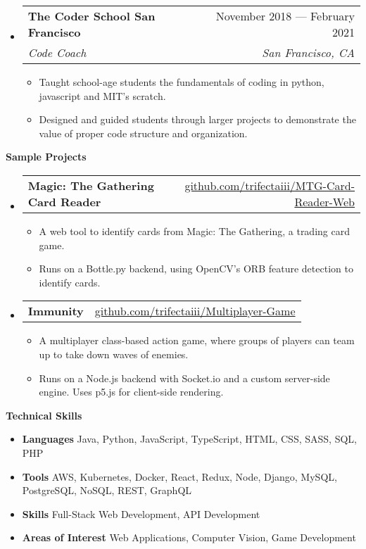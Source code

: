 \documentclass[letterpaper,12pt]{article}[leftmargin=*]
\makeatletter
\def \entryspacing {-0pt}
\renewcommand{\section}[2]{\vspace{5pt}
  \colorbox{secondary}{\color{white}\raggedbottom\normalsize\textbf{{#1}{\hspace{7pt}#2}}}
}
\newcommand{\resumeEntryStart}{\begin{itemize}[leftmargin=2.5mm]}
\newcommand{\resumeEntryEnd}{\end{itemize}\vspace{\entryspacing}}
\newcommand{\resumeItemListStart}{\begin{itemize}[leftmargin=4.5mm]}
\newcommand{\resumeItemListEnd}{\end{itemize}}
\newcommand{\resumeItem}[1]{
  \item{%
    {#1 \vspace{-2pt}}
  }
}
\newcommand{\resumeEntryTSDL}[4]{
  \vspace{-1pt}\item[]
    \begin{tabular*}{0.97\textwidth}{l@{\extracolsep{\fill}}r}
      \textbf{\color{primary}#1} & {\firabook\color{accent}\small#2} \\
      \textit{\color{accent}\small#3} & \textit{\color{accent}\small#4} \\
    \end{tabular*}\vspace{-6pt}
}
\newcommand{\resumeEntryTD}[2]{
  \vspace{-1pt}\item[]
    \begin{tabular*}{0.97\textwidth}{l@{\extracolsep{\fill}}r}
      \textbf{\color{primary}#1} & {\firabook\color{accent}\small#2} \\
    \end{tabular*}\vspace{-6pt}
}
\newcommand{\resumeEntryS}[2]{
  \item[]\small{
    \textbf{\color{primary}#1 }{ #2 \vspace{-6pt}}
  }
}
\makeatother
\begin{document}
  \resumeEntryStart
    \resumeEntryTSDL
      {The Coder School San Francisco}{November 2018 --- February 2021}
      {Code Coach}{San Francisco, CA}
    \resumeItemListStart
      \resumeItem {Taught school-age students the fundamentals of coding in python, javascript and MIT's scratch.}
      \resumeItem {Designed and guided students through larger projects to demonstrate the value of proper code structure and organization.}
    \resumeItemListEnd
  \resumeEntryEnd

\section{\faFlask}{Sample Projects}

  \resumeEntryStart
    \resumeEntryTD
      {Magic: The Gathering Card Reader}{\href{https://github.com/trifectaiii/MTG-Card-Reader-Web}{github.com/trifectaiii/MTG-Card-Reader-Web}}
    \resumeItemListStart
      \resumeItem {A web tool to identify cards from Magic: The Gathering, a trading card game.}
      \resumeItem {Runs on a Bottle.py backend, using OpenCV's ORB feature detection to identify cards.}
    \resumeItemListEnd
  \resumeEntryEnd
  
  \resumeEntryStart
    \resumeEntryTD
      {Immunity}{\href{https://github.com/trifectaiii/Multiplayer-Game}{github.com/trifectaiii/Multiplayer-Game}}
    \resumeItemListStart
      \resumeItem {A multiplayer class-based action game, where groups of players can team up to take down waves of enemies.}
      \resumeItem {Runs on a Node.js backend with Socket.io and a custom server-side engine. Uses p5.js for client-side rendering.}
    \resumeItemListEnd
  \resumeEntryEnd

\section{\faGears}{Technical Skills}
 \resumeEntryStart
  \resumeEntryS{Languages } {Java, Python, JavaScript, TypeScript, HTML, CSS, SASS, SQL, PHP}
  \resumeEntryS{Tools } {AWS, Kubernetes, Docker, React, Redux, Node, Django, MySQL, PostgreSQL, NoSQL, REST, GraphQL}
  \resumeEntryS{Skills } {Full-Stack Web Development, API Development }
  \resumeEntryS{Areas of Interest } {Web Applications, Computer Vision, Game Development}
 \resumeEntryEnd
 
\begin{center}
\begin{scriptsize}
\end{scriptsize}
\end{center}
\end{document}
